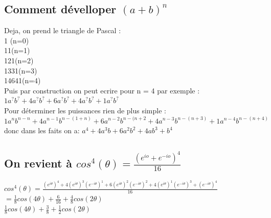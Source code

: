 \documentclass[10pt,a4paper]{article}
\begin{document}
 \subsection{Comment dévelloper $(a+b)^n$}
 Deja, on prend le triangle de Pascal :\\
 1 (n=0)\\
 11(n=1)\\
 121(n=2)\\
 1331(n=3)\\
 14641(n=4)\\
 Puis par construction on peut ecrire pour n = 4 par exemple : $1a^?b^? + 4a^?b^? + 6a^?b^?+4a^?b^?+1a^?b^?$\\
 Pour déterminer les puissances rien de plus simple :  $1a^{n}b^{n-n} + 4a^{n-1}b^{n-(1+n)} + 6a^{n-2}b^{n-(n+2}+4a^{n-3}b^{n-(n+3)}+1a^{n-4}b^{n-(n+4)}$\\
 donc dans les faits on a: $a^4+4a^3b+6a^2b^2+4ab^3+b^4$
 \newpage
 \subsection{On revient à $cos^4(\theta)=\frac{(e^{io}+e^{-io})^4}{16}$}
$cos^4(\theta)=\frac{(e^{i\theta})^4+4(e^{i\theta})^3(e^{-i\theta})^1+6(e^{i\theta})^2(e^{-i\theta})^2+4(e^{i\theta})^1(e^{-i\theta})^3+(e^{-i\theta})^4}{16}$\\

 $=\frac{1}{8}cos(4\theta)+\frac{6}{16}+\frac{4}{8}cos(2\theta)$\\
 
 $\frac{1}{8}cos(4\theta)+\frac{3}{8}+\frac{1}{2}cos(2\theta)$
 
 
\end{document}

